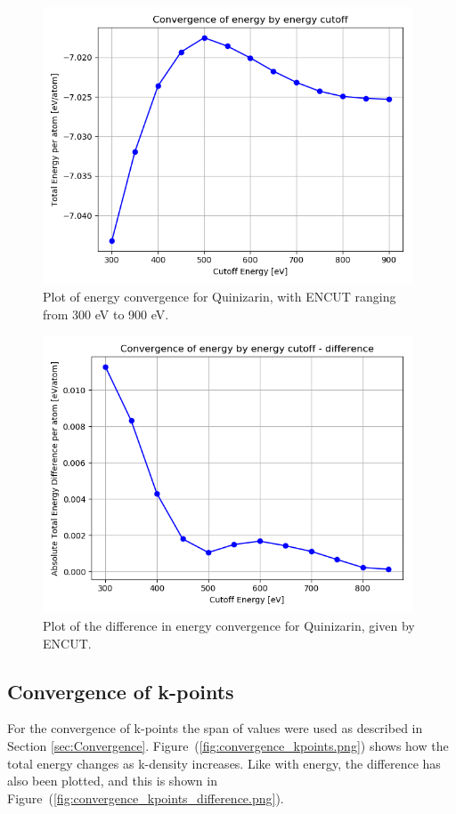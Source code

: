 \documentclass{article}
\begin{document}
    \begin{figure}[H]
      \centering
      \includegraphics[width = 11cm]{../fig/convergence_energy.png}
      \caption{Plot of energy convergence for Quinizarin, with ENCUT ranging from 300 eV to 900 eV. }
      \label{fig:convergence_energy.png}
    \end{figure}

    \begin{figure}[H]
      \centering
      \includegraphics[width = 11cm]{../fig/convergence_energy_difference.png}
      \caption{Plot of the difference in energy convergence for Quinizarin, given by ENCUT. }
      \label{fig:convergence_energy_difference.png}
    \end{figure}


  \subsection{Convergence of k-points}

    For the convergence of k-points the span of values were used as described in Section \ref{sec:Convergence}. Figure~(\ref{fig:convergence_kpoints.png}) shows how the total energy changes as k-density increases. Like with energy, the difference has also been plotted, and this is shown in Figure~(\ref{fig:convergence_kpoints_difference.png}).
\end{document}
